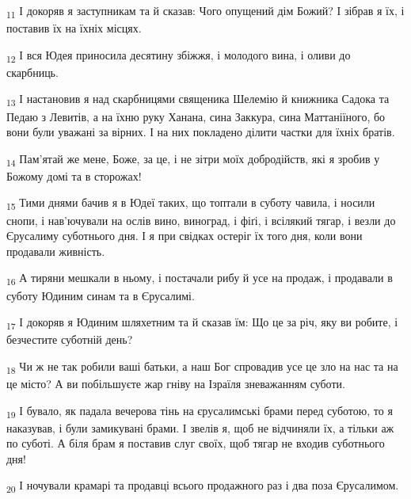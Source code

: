 \begin{tcolorbox}
\textsubscript{11} І докоряв я заступникам та й сказав: Чого опущений дім Божий? І зібрав я їх, і поставив їх на їхніх місцях.
\end{tcolorbox}
\begin{tcolorbox}
\textsubscript{12} І вся Юдея приносила десятину збіжжя, і молодого вина, і оливи до скарбниць.
\end{tcolorbox}
\begin{tcolorbox}
\textsubscript{13} І настановив я над скарбницями священика Шелемію й книжника Садока та Педаю з Левитів, а на їхню руку Ханана, сина Заккура, сина Маттаніїного, бо вони були уважані за вірних. І на них покладено ділити частки для їхніх братів.
\end{tcolorbox}
\begin{tcolorbox}
\textsubscript{14} Пам'ятай же мене, Боже, за це, і не зітри моїх добродійств, які я зробив у Божому домі та в сторожах!
\end{tcolorbox}
\begin{tcolorbox}
\textsubscript{15} Тими днями бачив я в Юдеї таких, що топтали в суботу чавила, і носили снопи, і нав'ючували на ослів вино, виноград, і фіґі, і всілякий тягар, і везли до Єрусалиму суботнього дня. І я при свідках остеріг їх того дня, коли вони продавали живність.
\end{tcolorbox}
\begin{tcolorbox}
\textsubscript{16} А тиряни мешкали в ньому, і постачали рибу й усе на продаж, і продавали в суботу Юдиним синам та в Єрусалимі.
\end{tcolorbox}
\begin{tcolorbox}
\textsubscript{17} І докоряв я Юдиним шляхетним та й сказав їм: Що це за річ, яку ви робите, і безчестите суботній день?
\end{tcolorbox}
\begin{tcolorbox}
\textsubscript{18} Чи ж не так робили ваші батьки, а наш Бог спровадив усе це зло на нас та на це місто? А ви побільшуєте жар гніву на Ізраїля зневажанням суботи.
\end{tcolorbox}
\begin{tcolorbox}
\textsubscript{19} І бувало, як падала вечерова тінь на єрусалимські брами перед суботою, то я наказував, і були замикувані брами. І звелів я, щоб не відчиняли їх, а тільки аж по суботі. А біля брам я поставив слуг своїх, щоб тягар не входив суботнього дня!
\end{tcolorbox}
\begin{tcolorbox}
\textsubscript{20} І ночували крамарі та продавці всього продажного раз і два поза Єрусалимом.
\end{tcolorbox}
